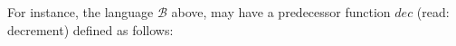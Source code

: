 














For instance, the language $\mathcal{B}$ above, may have a predecessor function
$dec$ (read: decrement) defined as follows:

